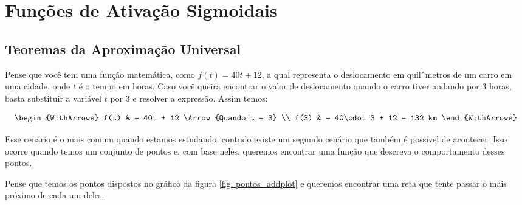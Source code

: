 
\chapter{Funções de Ativação Sigmoidais}
\label{cap:ativacao-sigmoidais}



\section{Teoremas da Aproximação Universal}

Pense que você tem uma função matemática, como $f(t) = 40t + 12$, a qual representa o deslocamento em quilˆmetros de um carro em uma cidade, onde $t$ é o tempo em horas. Caso você queira encontrar o valor de deslocamento quando o carro tiver andando por 3 horas, basta substituir a variável $t$ por 3 e resolver a expressão. Assim temos:

\[\begin{WithArrows}
    f(t) & = 40t + 12 \Arrow{Quando t = 3} \\
    f(3) & = 40\cdot 3 + 12 = 132 km
\end{WithArrows}\]

Esse cenário é o mais comum quando estamos estudando, contudo existe um segundo cenário que também é possível de acontecer. Isso ocorre quando temos um conjunto de pontos e, com base neles, queremos encontrar uma função que descreva o comportamento desses pontos.

Pense que temos os pontos dispostos no gráfico da figura \ref{fig: pontos_addplot} e queremos encontrar uma reta que tente passar o mais próximo de cada um deles.

